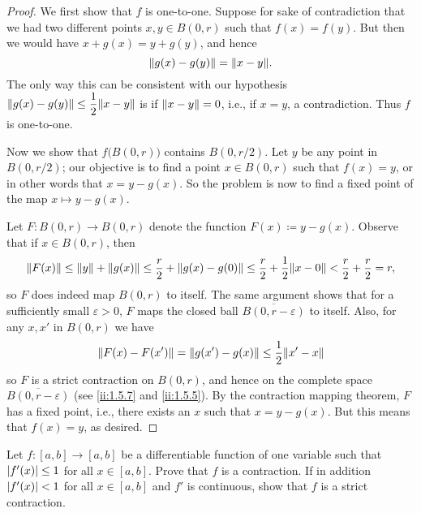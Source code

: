 \begin{proof}
  We first show that \(f\) is one-to-one.
  Suppose for sake of contradiction that we had two different points \(x, y \in B(0, r)\) such that \(f(x) = f(y)\).
  But then we would have \(x + g(x) = y + g(y)\), and hence
  \[
    \norm*{g(x) - g(y)} = \norm*{x - y}.
  \]
  The only way this can be consistent with our hypothesis \(\norm*{g(x) - g(y)} \leq \dfrac{1}{2} \norm*{x - y}\) is if \(\norm*{x - y} = 0\), i.e., if \(x = y\), a contradiction.
  Thus \(f\) is one-to-one.

  Now we show that \(f\big(B(0, r)\big)\) contains \(B(0, r / 2)\).
  Let \(y\) be any point in \(B(0, r / 2)\);
  our objective is to find a point \(x \in B(0, r)\) such that \(f(x) = y\), or in other words that \(x = y - g(x)\).
  So the problem is now to find a fixed point of the map \(x \mapsto y - g(x)\).

  Let \(F : B(0, r) \to B(0, r)\) denote the function \(F(x) \coloneqq y - g(x)\).
  Observe that if \(x \in B(0, r)\), then
  \[
    \norm*{F(x)} \leq \norm*{y} + \norm*{g(x)} \leq \dfrac{r}{2} + \norm*{g(x) - g(0)} \leq \dfrac{r}{2} + \dfrac{1}{2} \norm*{x - 0} < \dfrac{r}{2} + \dfrac{r}{2} = r,
  \]
  so \(F\) does indeed map \(B(0, r)\) to itself.
  The same argument shows that for a sufficiently small \(\varepsilon > 0\), \(F\) maps the closed ball \(\overline{B(0, r - \varepsilon)}\) to itself.
  Also, for any \(x, x'\) in \(B(0, r)\) we have
  \[
    \norm*{F(x) - F(x')} = \norm*{g(x') - g(x)} \leq \dfrac{1}{2} \norm*{x' - x}
  \]
  so \(F\) is a strict contraction on \(B(0, r)\), and hence on the complete space \(\overline{B(0, r - \varepsilon)}\) (see \cref{ii:1.5.7} and \cref{ii:1.5.5}).
  By the contraction mapping theorem, \(F\) has a fixed point, i.e., there exists an \(x\) such that \(x = y - g(x)\).
  But this means that \(f(x) = y\), as desired.
\end{proof}

\exercisesection

\begin{ex}\label{ii:ex:6.6.1}
  Let \(f : [a, b] \to [a, b]\) be a differentiable function of one variable such that \(\abs{f'(x)} \leq 1\) for all \(x \in [a, b]\).
  Prove that \(f\) is a contraction.
  If in addition \(\abs{f'(x)} < 1\) for all \(x \in [a, b]\) and \(f'\) is continuous, show that \(f\) is a strict contraction.
\end{ex}

